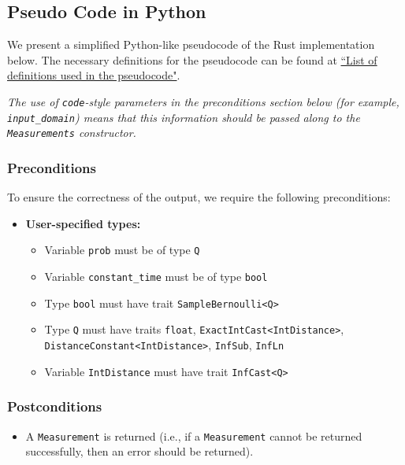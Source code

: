\documentclass[11pt,a4paper]{article}
\theoremstyle{definition}
\begin{document}
\subsection{Pseudo Code in Python}
We present a simplified Python-like pseudocode of the Rust implementation below. The necessary definitions for the pseudocode can be found at \href{https://github.com/opendp/whitepapers/blob/pseudocode-defns/pseudocode-defns/pseudocode_defns.pdf}{``List of definitions used in the pseudocode"}. %

\emph{The use of \texttt{code}-style parameters in the preconditions section below (for example, \texttt{input\_domain}) means that this information should be passed along to the \texttt{Measurements} constructor.}

\subsubsection*{Preconditions}
To ensure the correctness of the output, we require the following preconditions:

\begin{itemize}
    \item \textbf{User-specified types:}
    \begin{itemize}
        \item Variable \texttt{prob} must be of type \texttt{Q}
        \item Variable \texttt{constant\_time} must be of type \texttt{bool}
        \item Type \texttt{bool} must have trait \texttt{SampleBernoulli<Q>}
        \item Type \texttt{Q} must have traits \texttt{float}, \texttt{ExactIntCast<IntDistance>},\\ \texttt{DistanceConstant<IntDistance>}, \texttt{InfSub}, \texttt{InfLn}
        \item Variable \texttt{IntDistance} must have trait \texttt{InfCast<Q>}
    \end{itemize}
\end{itemize}

\subsubsection*{Postconditions}
\begin{itemize}
    \item A \texttt{Measurement} is returned (i.e., if a \texttt{Measurement} cannot be returned successfully, then an error should be returned).
\end{itemize}
\end{document}
